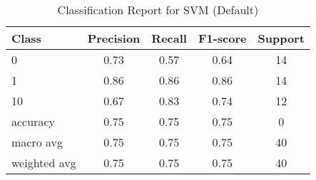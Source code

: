 \begin{table}[ht]
\centering
\caption{Classification Report for SVM (Default)}
\begin{tabular}{l|ccc|c}
\toprule
Class & Precision & Recall & F1-score & Support \\
\midrule
0 & 0.73 & 0.57 & 0.64 & 14 \\
1 & 0.86 & 0.86 & 0.86 & 14 \\
10 & 0.67 & 0.83 & 0.74 & 12 \\
\midrule
accuracy & 0.75 & 0.75 & 0.75 & 0 \\
\midrule
macro avg & 0.75 & 0.75 & 0.75 & 40 \\
\midrule
weighted avg & 0.75 & 0.75 & 0.75 & 40 \\
\bottomrule
\end{tabular}
\end{table}
